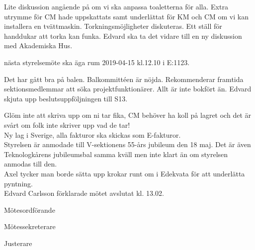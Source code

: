\documentclass[10pt]{article}
\def\mo{Edvard Carlsson}
\def\ms{Sonja Kenari}
\def\ji{Henrik Ramström}
\begin{document}
\begin{paragrafer}
Lite diskussion angående på om vi ska anpassa toaletterna för alla. Extra utrymme för CM hade uppskattats samt underlättat för KM och CM om vi kan installera en tvättmaskin. Torkningsmöjligheter diskuteras. Ett ställ för handdukar att torka kan funka. Edvard ska ta det vidare till en ny diskussion med Akademiska Hus.

\Mba nästa styrelsemöte ska äga rum 2019-04-15 kl.12.10 i E:1123.

Det har gått bra på balen. Balkommittéen är nöjda. Rekommenderar framtida sektionsmedlemmar att söka projektfunktionärer. Allt är inte bokfört än.
Edvard \ypa skjuta upp beslutsuppföljningen till S13.
\Mbaby

Glöm inte att skriva upp om ni tar fika, CM behöver ha koll på lagret och det är svårt om folk inte skriver upp vad de tar! \\
Ny lag i Sverige, alla fakturor ska skickas som E-fakturor. \\
Styrelsen är anmodade till V-sektionens 55-års jubileum den 18 maj. Det är även Teknologkårens jubileumsbal samma kväll men inte klart än om styrelsen anmodas till den. \\
Axel tycker man borde sätta upp krokar runt om i Edekvata för att underlätta pyntning. \\

{\mo} förklarade mötet avslutat kl. 13.02.
\end{paragrafer}

\hidesignfoot
\begin{signatures}{3}
\signature{\mo}{Mötesordförande}
\signature{\ms}{Mötessekreterare}
\signature{\ji}{Justerare}
\end{signatures}
\end{document}
